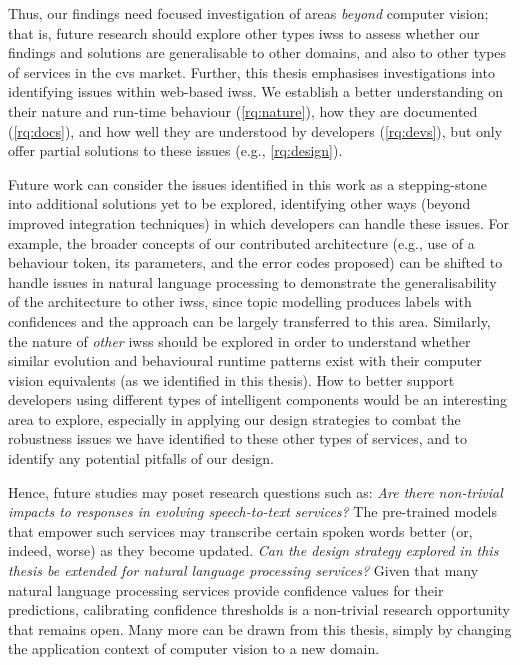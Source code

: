 Thus, our findings need focused investigation of areas \textit{beyond} computer vision; that is, future research should explore other types \glspl{iws} to assess whether our findings and solutions are generalisable to other domains, and also to other types of services in the \gls{cvs} market. Further, this thesis emphasises investigations into identifying issues within web-based \glspl{iws}. We establish a better understanding on their nature and run-time behaviour  (\ref{rq:nature}), how they are documented (\ref{rq:docs}), and how well they are understood by developers (\ref{rq:devs}), but only offer partial solutions to these issues (e.g., \ref{rq:design}). 

Future work can consider the issues identified in this work as a stepping-stone into additional solutions yet to be explored, identifying other ways (beyond improved integration techniques) in which developers can handle these issues. For example, the broader concepts of our contributed architecture (e.g., use of a behaviour token, its parameters, and the error codes proposed) can be shifted to handle issues in natural language processing to demonstrate the generalisability of the architecture to other \glspl{iws}, since topic modelling produces labels with confidences and the approach can be largely transferred to this area. Similarly, the nature of \textit{other} \glspl{iws} should be explored in order to understand whether similar evolution and behavioural runtime patterns exist with their computer vision equivalents (as we identified in this thesis). How to better support developers using different types of intelligent components would be an interesting area to explore, especially in applying our design strategies to combat the robustness issues we have identified to these other types of services, and to identify any potential pitfalls of our design.  

Hence, future studies may poset research questions such as: \textit{Are there non-trivial impacts to responses in evolving speech-to-text services?} The pre-trained models that empower such services may transcribe certain spoken words better (or, indeed, worse) as they become updated. \textit{Can the design strategy explored in this thesis be extended for natural language processing services?} Given that many natural language processing services provide confidence values for their predictions, calibrating confidence thresholds is a non-trivial research opportunity that remains open. Many more can be drawn from this thesis, simply by changing the application context of computer vision to a new domain.

